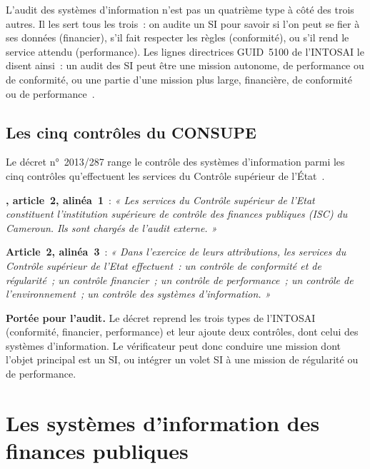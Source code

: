 L'audit des systèmes d'information n'est pas un quatrième type à côté des
trois autres. Il les sert tous les trois~: on audite un SI pour savoir si
l'on peut se fier à ses données (financier), s'il fait respecter les règles
(conformité), ou s'il rend le service attendu (performance). Les lignes
directrices GUID~5100 de l'INTOSAI le disent ainsi~: un audit des SI peut
être une mission autonome, de performance ou de conformité, ou une partie
d'une mission plus large, financière, de conformité ou de
performance~\cite{intosai2019guid5100}.

\subsection{Les cinq contrôles du CONSUPE}

Le décret n°~2013/287 range le contrôle des systèmes d'information parmi
les cinq contrôles qu'effectuent les services du Contrôle supérieur de
l'État~\cite{decret2013287consupe}.

\begin{boxjuris}
\textbf{, article~2, alinéa~1}~: \textit{« Les
services du Contrôle supérieur de l'Etat constituent l'institution
supérieure de contrôle des finances publiques (ISC) du Cameroun. Ils sont
chargés de l'audit externe. »}

\medskip
\textbf{Article~2, alinéa~3}~: \textit{« Dans l'exercice de leurs
attributions, les services du Contrôle supérieur de l'Etat effectuent~:
un contrôle de conformité et de régularité~; un contrôle financier~; un
contrôle de performance~; un contrôle de l'environnement~; un contrôle des
systèmes d'information. »}

\medskip
\textbf{Portée pour l'audit.} Le décret reprend les trois types de
l'INTOSAI (conformité, financier, performance) et leur ajoute deux
contrôles, dont celui des systèmes d'information. Le vérificateur peut
donc conduire une mission dont l'objet principal est un SI, ou intégrer un
volet SI à une mission de régularité ou de performance.
\end{boxjuris}

\separateur

\section{Les systèmes d'information des finances publiques}
\label{sec:c01-cartographie}


